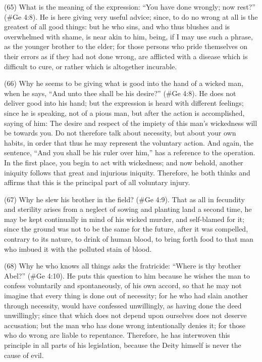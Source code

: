 (65) What is the meaning of the expression: ``You have done wrongly; now rest?'' (\#Ge 4:8).
He is here giving very useful advice; since, to do no wrong at all is the greatest of all good things:
but he who sins, and who thus blushes and is overwhelmed with shame, is near akin to him, being,
if I may use such a phrase, as the younger brother to the elder; for those persons who pride
themselves on their errors as if they had not done wrong, are afflicted with a disease which is
difficult to cure, or rather which is altogether incurable.

(66) Why he seems to be giving what is good into the hand of a wicked man, when he says, ``And
unto thee shall be his desire?'' (\#Ge 4:8). He does not deliver good into his hand; but the
expression is heard with different feelings; since he is speaking, not of a pious man, but after the
action is accomplished, saying of him: The desire and respect of the impiety of this man's
wickedness will be towards you. Do not therefore talk about necessity, but about your own habits,
in order that thus he may represent the voluntary action. And again, the sentence, ``And you shall
be his ruler over him,'' has a reference to the operation. In the first place, you begin to act with
wickedness; and now behold, another iniquity follows that great and injurious iniquity. Therefore, he
both thinks and affirms that this is the principal part of all voluntary injury.

(67) Why he slew his brother in the field? (\#Ge 4:9). That as all in fecundity and sterility arises
from a neglect of sowing and planting land a second time, he may be kept continually in mind of his
wicked murder, and self-blamed for it; since the ground was not to be the same for the future, after
it was compelled, contrary to its nature, to drink of human blood, to bring forth food to that man who
imbued it with the polluted stain of blood.

(68) Why he who knows all things asks the fratricide: ``Where is thy brother Abel?'' (\#Ge 4:10).
He puts this question to him because he wishes the man to confess voluntarily and spontaneously,
of his own accord, so that he may not imagine that every thing is done out of necessity; for he who
had slain another through necessity, would have confessed unwillingly, as having done the deed
unwillingly; since that which does not depend upon ourselves does not deserve accusation; but the
man who has done wrong intentionally denies it; for those who do wrong are liable to repentance.
Therefore, he has interwoven this principle in all parts of his legislation, because the Deity himself
is never the cause of evil.

